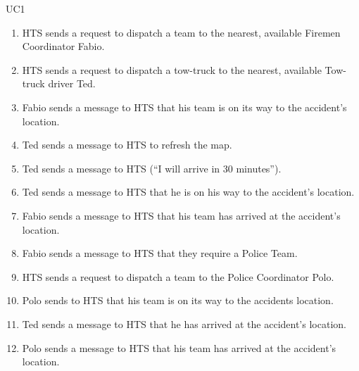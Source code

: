 \begin{lyxlist}{UC1}
{\begin{enumerate}
  \item HTS sends a request to dispatch a team to the nearest, available Firemen
  Coordinator Fabio.
  \item HTS sends a request to dispatch a tow-truck to the nearest, available
  Tow-truck driver Ted.
  \item Fabio sends a message to HTS that his team is on its way to the
  accident’s location.
  \item Ted sends a message to HTS to refresh the map.
  \item Ted sends a message to HTS (``I will arrive in 30 minutes'').
  \item Ted sends a message to HTS that he is on his way to the accident’s
  location.
  \item Fabio sends a message to HTS that his team has arrived at the accident’s
  location.
  \item Fabio sends a message to HTS that they require a Police Team.
  \item HTS sends a request to dispatch a team to the Police Coordinator Polo.
  \item Polo sends to HTS that his team is on its way to the accidents
  location.
  \item Ted sends a message to HTS that he has arrived at the accident’s
  location.
  \item Polo sends a message to HTS that his team has arrived at the accident’s
  location.
\end{enumerate}
}
\end{lyxlist}



